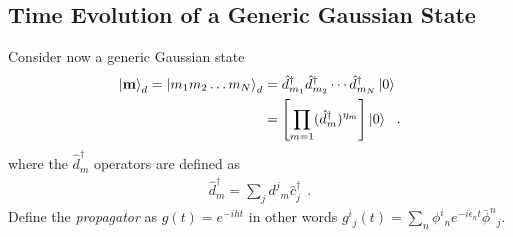 \documentclass[aps, superscriptaddress, floatfix, onecolumn]{revtex4-2}
\begin{document}
\subsection{Time Evolution of a Generic Gaussian State}

Consider now a generic Gaussian state
\begin{align}
\ket{\mathbf{m}}_d = \ket{m_1 m_2 \ldots m_{N}}_d & = \hat{d}^\dagger_{m_1} \hat{d}^\dagger_{m_2} \cdots \hat{d}^\dagger_{m_{N}} \ket{0} \\
& = \left[ \prod_{m=1} (\hat{d}^\dagger_{m})^{\eta_m} \right] \ket{0} \ \ .
\end{align}
where the $\hat{d}^\dagger_m$ operators are defined as
\begin{align}
\hat{d}^\dagger_m = \sum_j d^j\!_m \hat{c}^\dagger_j \ \ . \label{eq:ddag_c_transform}
\end{align}
Define the \emph{propagator} as $\boxed{g(t) = e^{- i h t}}$ in other words $\boxed{g^i\!_j(t) = \sum_n \phi^i\!_n e^{-i \epsilon_n t} \bar{\phi}^n\!_j}$.
\end{document}
